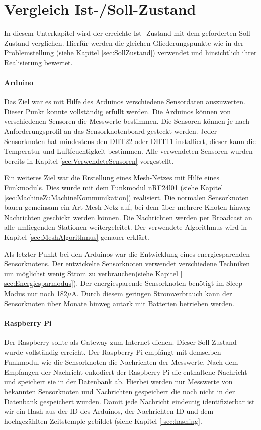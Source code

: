 \section{Vergleich Ist-/Soll-Zustand}
\label{sec:VergleichIstSollZustand}
In diesem Unterkapitel wird der erreichte Ist- Zustand mit dem geforderten Soll-Zustand verglichen. Hierfür werden die gleichen Gliederungspunkte wie in der Problemstellung (siehe Kapitel \ref{sec:SollZustand}) verwendet und hinsichtlich ihrer Realisierung bewertet.
\paragraph{Arduino} Das Ziel war es mit Hilfe des Arduinos verschiedene Sensordaten auszuwerten. Dieser Punkt konnte vollständig erfüllt werden. Die Arduinos können von verschiedenen Sensoren die Messwerte bestimmen. Die Sensoren können je nach Anforderungsprofil an das Sensorknotenboard gesteckt werden. Jeder Sensorknoten hat mindestens den DHT22 oder DHT11 installiert, dieser kann die Temperatur und Luftfeuchtigkeit bestimmen. Alle verwendeten Sensoren wurden bereits in Kapitel \ref{sec:VerwendeteSensoren} vorgestellt.

Ein weiteres Ziel war die Erstellung eines Mesh-Netzes mit Hilfe eines Funkmoduls. Dies wurde mit dem Funkmodul nRF24l01 (siehe Kapitel \ref{sec:MachineZuMachineKommunikation}) realisiert. Die normalen Sensorknoten bauen gemeinsam ein Art Mesh-Netz auf, bei dem über mehrere Knoten hinweg Nachrichten geschickt werden können. Die Nachrichten werden per Broadcast an alle umliegenden Stationen weitergeleitet. Der verwendete Algorithmus wird in Kapitel \ref{sec:MeshAlgorithmus} genauer erklärt.

Als letzter Punkt bei den Arduinos war die Entwicklung eines energiesparenden Sensorknotens. Der entwickelte Sensorknoten verwendet verschiedene Techniken um möglichst wenig Strom zu verbrauchen(siehe Kapitel \ref{ sec:Energiesparmodus}). Der energiesparende Sensorknoten benötigt im Sleep-Modus nur noch 182$\mu$A. Durch diesem geringen Stromverbrauch kann der Sensorknoten über Monate hinweg autark mit Batterien betrieben werden.
\paragraph{Raspberry Pi} Der Raspberry sollte als Gateway zum Internet dienen. Dieser Soll-Zustand wurde vollständig erreicht. Der Raspberry Pi empfängt mit demselben Funkmodul wie die Sensorknoten die Nachrichten der Messwerte. Nach dem Empfangen der Nachricht enkodiert der Raspberry Pi die enthaltene Nachricht und speichert sie in der Datenbank ab. Hierbei werden nur Messwerte von bekannten Sensorknoten und Nachrichten gespeichert die noch nicht in der Datenbank gespeichert wurden. Damit jede Nachricht eindeutig identifizierbar ist wir ein Hash aus der ID des Arduinos, der Nachrichten ID und dem hochgezählten Zeitstemple gebildet (siehe Kapitel \ref{ sec:hashing}. 

